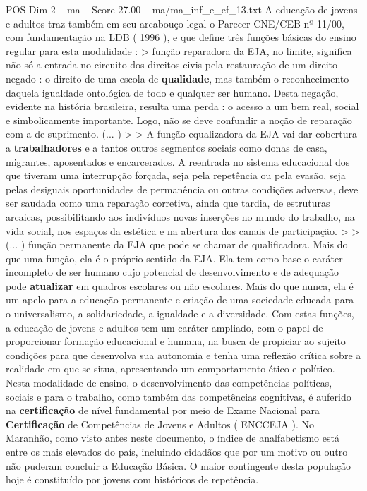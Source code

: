 \begin{textsample}{POS Dim 2 – ma – Score 27.00 – ma/ma\_inf\_e\_ef\_13.txt}
A educação de jovens e adultos traz também em seu arcabouço legal o Parecer CNE/CEB nº 11/00, com fundamentação na LDB ( 1996 ), e que define três funções básicas do ensino regular para esta modalidade : > função reparadora da EJA, no limite, significa não só a entrada no circuito dos direitos civis pela restauração de um direito negado : o direito de uma escola de \textbf{qualidade}, mas também o reconhecimento daquela igualdade ontológica de todo e qualquer ser humano.
Desta negação, evidente na história brasileira, resulta uma perda : o acesso a um bem real, social e simbolicamente importante.
Logo, não se deve confundir a noção de reparação com a de suprimento. (... ) > > A função equalizadora da EJA vai dar cobertura a \textbf{trabalhadores} e a tantos outros segmentos sociais como donas de casa, migrantes, aposentados e encarcerados.
A reentrada no sistema educacional dos que tiveram uma interrupção forçada, seja pela repetência ou pela evasão, seja pelas desiguais oportunidades de permanência ou outras condições adversas, deve ser saudada como uma reparação corretiva, ainda que tardia, de estruturas arcaicas, possibilitando aos indivíduos novas inserções no mundo do trabalho, na vida social, nos espaços da estética e na abertura dos canais de participação. > > (... ) função permanente da EJA que pode se chamar de qualificadora.
Mais do que uma função, ela é o próprio sentido da EJA.
Ela tem como base o caráter incompleto de ser humano cujo potencial de desenvolvimento e de adequação pode \textbf{atualizar} em quadros escolares ou não escolares.
Mais do que nunca, ela é um apelo para a educação permanente e criação de uma sociedade educada para o universalismo, a solidariedade, a igualdade e a diversidade.
Com estas funções, a educação de jovens e adultos tem um caráter ampliado, com o papel de proporcionar formação educacional e humana, na busca de propiciar ao sujeito condições para que desenvolva sua autonomia e tenha uma reflexão crítica sobre a realidade em que se situa, apresentando um comportamento ético e político.
Nesta modalidade de ensino, o desenvolvimento das competências políticas, sociais e para o trabalho, como também das competências cognitivas, é auferido na \textbf{certificação} de nível fundamental por meio de Exame Nacional para \textbf{Certificação} de Competências de Jovens e Adultos ( ENCCEJA ).
No Maranhão, como visto antes neste documento, o índice de analfabetismo está entre os mais elevados do país, incluindo cidadãos que por um motivo ou outro não puderam concluir a Educação Básica.
O maior contingente desta população hoje é constituído por jovens com históricos de repetência.

\end{textsample}
